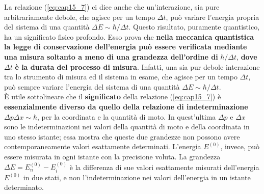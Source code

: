 \documentclass[a4paper,12pt,oneside]{book}
\begin{document}
La relazione (\ref{eq:cap15_7}) ci dice anche che un'interazione, sia pure arbitrariamente debole, che agisce per un tempo $\Delta t$, può variare l'energia propria del sistema di una quantità $\Delta E \sim \hbar /\Delta t$. Questo risultato, puramente quantistico, ha un significato fisico profondo. Esso prova che \textbf{nella meccanica quantistica la legge di conservazione dell'energia può essere verificata mediante una misura soltanto a meno di una grandezza dell'ordine di} $\hbar /\Delta t$, \textbf{dove } $\Delta t$ \textbf{è la durata del processo di misura}. Infatti, una sia pur debole interazione tra lo strumento di misura ed il sistema in esame, che agisce per un tempo $\Delta t $, può sempre variare l'energia del sistema di una quantità $\Delta E \sim \hbar /\Delta t$.\\

È utile sottolineare che il \textbf{significato} della relazione (\ref{eq:cap15_7}) è \textbf{essenzialmente diverso da quello della relazione di indeterminazione} $\Delta p \Delta x\sim \hbar$, per la coordinata e la quantità di moto. In quest'ultima $\Delta p$ e $\Delta x$ sono le indeterminazioni nei valori della quantità di moto e della coordinata in uno stesso istante;  essa mostra che queste due grandezze non possono avere contemporaneamente valori esattamente determinati. L'energia $E ^{(0)}$, invece, può essere misurata in ogni istante con la precisione voluta. La grandezza $\Delta E = E_n ^{(0)} - E_i ^{(0)}$ è la differenza di sue valori esattamente misurati dell'energia $E^{(0)}$ in due stati, e non l'indeterminazione nei valori dell'energia in un istante determinato.\\
\end{document}
